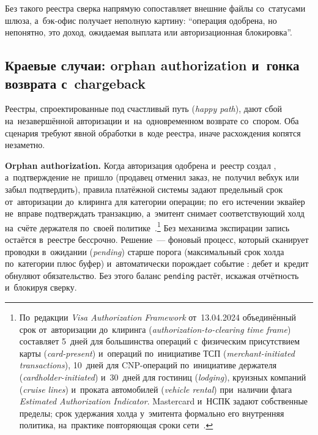 Без такого реестра сверка напрямую сопоставляет внешние файлы со~статусами
шлюза, а~бэк-офис получает неполную картину: \enquote{операция одобрена, но
непонятно, это доход, ожидаемая выплата или авторизационная блокировка}.

\subsection*{Краевые случаи: orphan authorization и~гонка возврата с~chargeback}

Реестры, спроектированные под счастливый путь (\textit{happy path}), дают сбой
на~незавершённой авторизации и~на~одновременном возврате со~спором. Оба
сценария требуют явной обработки в~коде реестра, иначе расхождения копятся
незаметно.

\textbf{Orphan authorization.} Когда авторизация одобрена и~реестр создал
, а~подтверждение не~пришло (продавец отменил заказ,
не~получил вебхук или забыл подтвердить), правила платёжной системы задают
предельный срок от~авторизации до~клиринга для категории операции; по~его
истечении эквайер не~вправе подтверждать транзакцию, а~эмитент снимает
соответствующий холд на~счёте держателя по~своей
политике~\cite{visa-core-rules}.\footnote{По~редакции
  \textit{Visa Authorization Framework} от~13.04.2024 объединённый срок
  от~авторизации до~клиринга (\textit{authorization-to-clearing time frame})
  составляет 5~дней для большинства операций с~физическим присутствием карты
  (\textit{card-present}) и~операций по~инициативе ТСП
  (\textit{merchant-initiated transactions}), 10~дней для CNP-операций
  по~инициативе держателя (\textit{cardholder-initiated}) и~30~дней
  для гостиниц (\textit{lodging}), круизных компаний (\textit{cruise lines})
  и~проката автомобилей (\textit{vehicle rental}) при~наличии флага
  \textit{Estimated Authorization Indicator}. Mastercard и~НСПК задают
  собственные пределы; срок
  удержания холда у~эмитента формально его внутренняя политика, на~практике
повторяющая сроки сети~\cite{mc-rules,nspk-mir-rules}.} Без механизма экспирации запись 
остаётся в~реестре бессрочно. Решение~--- фоновый
процесс, который сканирует проводки в~ожидании (\textit{pending}) старше порога
(максимальный срок холда по~категории плюс буфер) и~автоматически порождает
событие : дебет  и~кредит
 обнуляют обязательство. Без этого баланс
\texttt{pending} растёт, искажая отчётность и~блокируя сверку.

